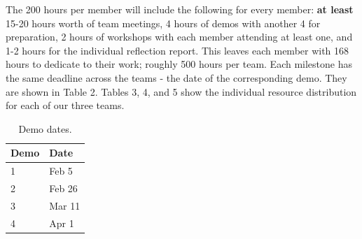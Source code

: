 \documentclass{article}
\begin{document}
The 200 hours per member will include the following for every member: {\bf at least} 15-20 hours worth of team meetings, 4 hours of demos with another 4 for preparation, 2 hours of workshops with each member attending at least one, and 1-2 hours for the individual reflection report. This leaves each member with 168 hours to dedicate to their work; roughly 500 hours per team. Each milestone has the same deadline across the teams - the date of the corresponding demo. They are shown in Table 2. Tables 3, 4, and 5 show the individual resource distribution for each of our three teams.
\begin{table}[]
  \begin{center}
  \begin{tabular}{ll}
    \hline
    Demo & Date   \\
    \hline
    1 & Feb 5 \\
    2 & Feb 26 \\
    3 & Mar 11 \\
    4 & Apr 1\\ \hline
  \end{tabular}
  \end{center}
  \caption{Demo dates.}
\end{table}
\end{document}
